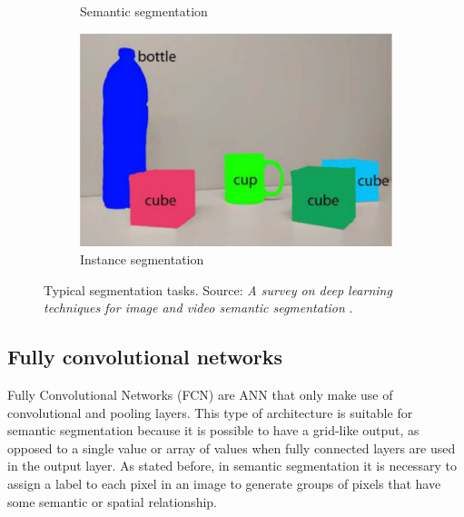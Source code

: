 \begin{figure}
\begin{subfigure}[b]{0.45\textwidth}
    \caption{Semantic segmentation}
    \label{fig:semantic}
  \end{subfigure}
\hfill
  \begin{subfigure}[b]{0.45\textwidth}
    \includegraphics[width=\linewidth]{Images/Background/s4.png}
    \caption{Instance segmentation}
    \label{fig:instance}
  \end{subfigure}
  \caption[Typical segmentation tasks]{Typical segmentation tasks. Source: \textit{A survey on deep learning techniques for image and video semantic segmentation} \cite{segmentation-survey-2}.}
  \label{fig:segment-types}
\end{figure}

\subsection{Fully convolutional networks}
Fully Convolutional Networks (FCN) are ANN that only make use of convolutional and pooling layers. This type of architecture is suitable for semantic segmentation because it is possible to have a grid-like output, as opposed to a single value or array of values when fully connected layers are used in the output layer. As stated before, in semantic segmentation it is necessary to assign a label to each pixel in an image to generate groups of pixels that have some semantic or spatial relationship.

